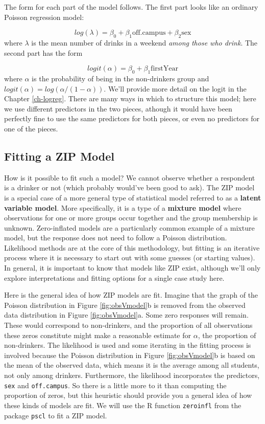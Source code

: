 \documentclass[
]{krantz}
\begin{document}
The form for each part of the model follows. The first part looks like an ordinary Poisson regression model:

\[
log(\lambda)=\beta_0+\beta_1\textrm{off.campus}+ \beta_2\textrm{sex}
\]
where \(\lambda\) is the mean number of drinks in a weekend \emph{among those who drink}.
The second part has the form

\[
logit(\alpha)=\beta_0+\beta_1\textrm{firstYear}
\]
where \(\alpha\) is the probability of being in the non-drinkers group and \(logit(\alpha) = log( \alpha/(1-\alpha))\). We'll provide more detail on the logit in the Chapter \ref{ch-logreg}. There are many ways in which to structure this model; here we use different predictors in the two pieces, athough it would have been perfectly fine to use the same predictors for both pieces, or even no predictors for one of the pieces.

\hypertarget{fitting-a-zip-model}{%
\subsection{Fitting a ZIP Model}\label{fitting-a-zip-model}}

How is it possible to fit such a model? We cannot observe whether a respondent is a drinker or not (which probably would've been good to ask). The ZIP model is a special case of a more general type of statistical model referred to as a \textbf{latent variable model}. More specifically, it is a type of a \textbf{mixture model}  where observations for one or more groups occur together and the group membership is unknown. Zero-inflated models are a particularly common example of a mixture model, but the response does not need to follow a Poisson distribution. Likelihood methods are at the core of this methodology, but fitting is an iterative process where it is necessary to start out with some guesses (or starting values). In general, it is important to know that models like ZIP exist, although we'll only explore interpretations and fitting options for a single case study here.

Here is the general idea of how ZIP models are fit. Imagine that the graph of the Poisson distribution in Figure \ref{fig:obsVmodel}b is removed from the observed data distribution in Figure \ref{fig:obsVmodel}a. Some zero responses will remain. These would correspond to non-drinkers, and the proportion of all observations these zeros constitute might make a reasonable estimate for \(\alpha\), the proportion of non-drinkers. The likelihood is used and some iterating in the fitting process is involved because the Poisson distribution in Figure \ref{fig:obsVmodel}b is based on the mean of the observed data, which means it is the average among all students, not only among drinkers. Furthermore, the likelihood incorporates the predictors, \texttt{sex} and \texttt{off.campus}. So there is a little more to it than computing the proportion of zeros, but this heuristic should provide you a general idea of how these kinds of models are fit. We will use the R function \texttt{zeroinfl} from the package \texttt{pscl} to fit a ZIP model.
\end{document}
